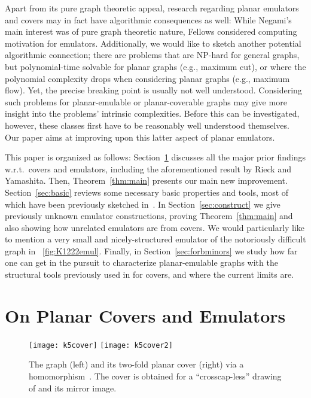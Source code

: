 \documentclass[envcountsect,envcountsame]{llncs}
\begin{document}
\medskip
Apart from its pure graph theoretic appeal, research regarding planar emulators and
covers may in fact have algorithmic consequences as well: While Negami's main
interest \cite{cit:double} was of pure graph theoretic nature, Fellows 
\cite[and personal communication]{cit:fellows} considered
computing motivation for emulators.
Additionally, we would like to sketch another potential algorithmic connection; 
there are problems that are NP-hard for general graphs, 
but polynomial-time solvable for planar graphs (e.g., maximum cut), or
where the polynomial complexity drops when considering planar graphs (e.g.,
maximum flow). 
Yet, the precise breaking point is usually not well understood.
Considering such problems for planar-emulable or planar-coverable graphs may
give more insight into the problems' intrinsic complexities. Before this can be
investigated, however, these classes first have to be reasonably well understood
themselves. 
Our paper aims at improving upon this latter aspect of planar emulators.

This paper is organized as follows:
Section~\ref{sec:emulators} discusses all the major prior findings 
w.r.t.\ covers and emulators, including the aforementioned result by Rieck and Yamashita.
Then, Theorem~\ref{thm:main} presents our main new improvement.
Section~\ref{sec:basic} reviews some necessary basic properties and tools,
most of which have been previously sketched in~\cite{cit:femul}.
In Section~\ref{sec:construct} we give previously unknown emulator
constructions, proving Theorem~\ref{thm:main} and also
showing how unrelated emulators are from covers. 
We would particularly like to mention a very small and nicely-structured emulator of
the notoriously difficult graph  in
\figurename~\ref{fig:K1222emul}.
Finally, in Section~\ref{sec:forbminors} we study how far one can get in the
pursuit to characterize planar-emulable graphs with the structural tools previously
used in \cite{cit:counterex} for covers, and where the current limits are.










\section{On Planar Covers and Emulators}
\label{sec:emulators}


\begin{figure}[tb]\centering

\texttt{[image: k5cover]}
\qquad\raise 12mm\hbox{\normalsize\boldmath}\qquad
\texttt{[image: k5cover2]}\qquad~
\caption{The graph  (left) and its two-fold planar cover (right) via
	a homomorphism~.
	The cover is obtained for a ``crosscap-less'' drawing of  and its
	 mirror image.}
\label{fig:coverK5}
\end{figure}
\end{document}
